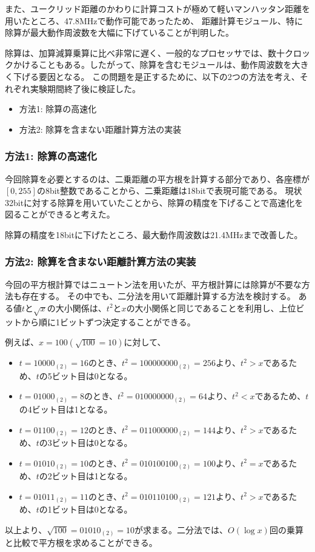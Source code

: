 また、ユークリッド距離のかわりに計算コストが極めて軽いマンハッタン距離を用いたところ、47.8MHzで動作可能であったため、
距離計算モジュール、特に除算が最大動作周波数を大幅に下げていることが判明した。

除算は、加算減算乗算に比べ非常に遅く、一般的なプロセッサでは、数十クロックかけることもある。\cite{InfographicsOperationCosts2016}したがって、除算を含むモジュールは、動作周波数を大きく下げる要因となる。
この問題を是正するために、以下の2つの方法を考え、それぞれ実験期間終了後に検証した。
\begin{itemize}
    \item 方法1: 除算の高速化
    \item 方法2: 除算を含まない距離計算方法の実装
\end{itemize}
\subsubsection{方法1: 除算の高速化}
今回除算を必要とするのは、二乗距離の平方根を計算する部分であり、各座標が$[0,255]$の8bit整数であることから、二乗距離は18bitで表現可能である。
現状32bitに対する除算を用いていたことから、除算の精度を下げることで高速化を図ることができると考えた。

除算の精度を18bitに下げたところ、最大動作周波数は21.4MHzまで改善した。

\subsubsection{方法2: 除算を含まない距離計算方法の実装}
今回の平方根計算ではニュートン法を用いたが、平方根計算には除算が不要な方法も存在する。
その中でも、二分法を用いて距離計算する方法を検討する。
ある値$t$と$\sqrt{x}$の大小関係は、$t^2$と$x$の大小関係と同じであることを利用し、上位ビットから順に1ビットずつ決定することができる。

例えば、$x=100 (\sqrt{100}=10)$に対して、
\begin{itemize}
    \item $t=10000_{(2)}=16$のとき、$t^2=100000000_{(2)}=256$より、$t^2>x$であるため、$t$の5ビット目は0となる。
    \item $t=01000_{(2)}=8$のとき、$t^2=010000000_{(2)}=64$より、$t^2<x$であるため、$t$の4ビット目は1となる。
    \item $t=01100_{(2)}=12$のとき、$t^2=011000000_{(2)}=144$より、$t^2>x$であるため、$t$の3ビット目は0となる。
    \item $t=01010_{(2)}=10$のとき、$t^2=010100100_{(2)}=100$より、$t^2=x$であるため、$t$の2ビット目は1となる。
    \item $t=01011_{(2)}=11$のとき、$t^2=010110100_{(2)}=121$より、$t^2>x$であるため、$t$の1ビット目は0となる。
\end{itemize}
以上より、$\sqrt{100}=01010_{(2)}=10$が求まる。二分法では、$O(\log x)$回の乗算と比較で平方根を求めることができる。

